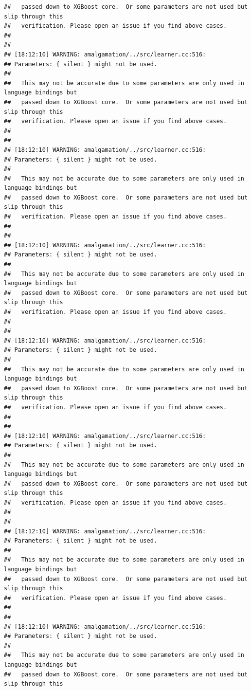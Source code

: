 \documentclass[AMS,STIX2COL]{WileyNJD-v2}\usepackage[]{graphicx}\usepackage[]{color}
\makeatletter
\newenvironment{kframe}{%
 \def\at@end@of@kframe{}%
 \ifinner\ifhmode%
  \def\at@end@of@kframe{\end{minipage}}%
  \begin{minipage}{\columnwidth}%
 \fi\fi%
 \def\FrameCommand##1{\hskip\@totalleftmargin \hskip-\fboxsep
 \colorbox{shadecolor}{##1}\hskip-\fboxsep
     \hskip-\linewidth \hskip-\@totalleftmargin \hskip\columnwidth}%
 \MakeFramed {\advance\hsize-\width
   \@totalleftmargin\z@ \linewidth\hsize
   \@setminipage}}%
 {\par\unskip\endMakeFramed%
 \at@end@of@kframe}
\newenvironment{knitrout}{}{} %
\makeatother
\begin{document}
\begin{knitrout}
\begin{kframe}
\begin{verbatim}
##   passed down to XGBoost core.  Or some parameters are not used but slip through this
##   verification. Please open an issue if you find above cases.
## 
## 
## [18:12:10] WARNING: amalgamation/../src/learner.cc:516: 
## Parameters: { silent } might not be used.
## 
##   This may not be accurate due to some parameters are only used in language bindings but
##   passed down to XGBoost core.  Or some parameters are not used but slip through this
##   verification. Please open an issue if you find above cases.
## 
## 
## [18:12:10] WARNING: amalgamation/../src/learner.cc:516: 
## Parameters: { silent } might not be used.
## 
##   This may not be accurate due to some parameters are only used in language bindings but
##   passed down to XGBoost core.  Or some parameters are not used but slip through this
##   verification. Please open an issue if you find above cases.
## 
## 
## [18:12:10] WARNING: amalgamation/../src/learner.cc:516: 
## Parameters: { silent } might not be used.
## 
##   This may not be accurate due to some parameters are only used in language bindings but
##   passed down to XGBoost core.  Or some parameters are not used but slip through this
##   verification. Please open an issue if you find above cases.
## 
## 
## [18:12:10] WARNING: amalgamation/../src/learner.cc:516: 
## Parameters: { silent } might not be used.
## 
##   This may not be accurate due to some parameters are only used in language bindings but
##   passed down to XGBoost core.  Or some parameters are not used but slip through this
##   verification. Please open an issue if you find above cases.
## 
## 
## [18:12:10] WARNING: amalgamation/../src/learner.cc:516: 
## Parameters: { silent } might not be used.
## 
##   This may not be accurate due to some parameters are only used in language bindings but
##   passed down to XGBoost core.  Or some parameters are not used but slip through this
##   verification. Please open an issue if you find above cases.
## 
## 
## [18:12:10] WARNING: amalgamation/../src/learner.cc:516: 
## Parameters: { silent } might not be used.
## 
##   This may not be accurate due to some parameters are only used in language bindings but
##   passed down to XGBoost core.  Or some parameters are not used but slip through this
##   verification. Please open an issue if you find above cases.
## 
## 
## [18:12:10] WARNING: amalgamation/../src/learner.cc:516: 
## Parameters: { silent } might not be used.
## 
##   This may not be accurate due to some parameters are only used in language bindings but
##   passed down to XGBoost core.  Or some parameters are not used but slip through this

\end{verbatim}
\end{kframe}
\end{knitrout}
\end{document}
